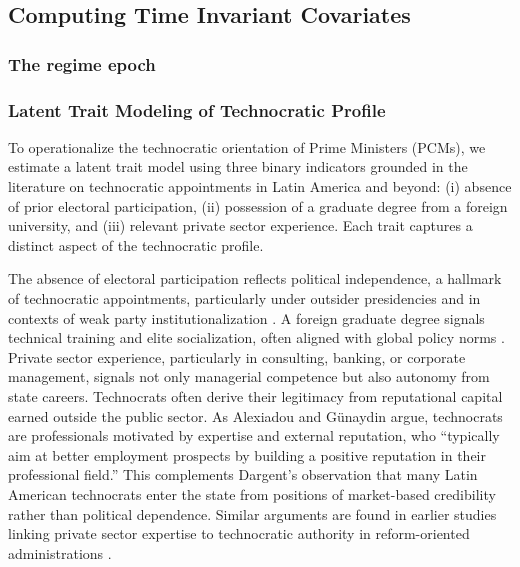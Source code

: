 \documentclass[a4paper, 12pt]{article}
\begin{document}

\subsection{Computing Time Invariant Covariates}

\subsubsection{The regime epoch}

\subsubsection{Latent Trait Modeling of Technocratic Profile}

To operationalize the technocratic orientation of Prime Ministers (PCMs), we estimate a latent trait model using three binary indicators grounded in the literature on technocratic appointments in Latin America and beyond: (i) absence of prior electoral participation, (ii) possession of a graduate degree from a foreign university, and (iii) relevant private sector experience. Each trait captures a distinct aspect of the technocratic profile.

The absence of electoral participation reflects political independence, a hallmark of technocratic appointments, particularly under outsider presidencies and in contexts of weak party institutionalization \citep{escobar-lemmon_coming_2010, carreras_presidentes_2013}. A foreign graduate degree signals technical training and elite socialization, often aligned with global policy norms \citep{alexiadou_ideologues_2016, camp_mexicos_2002}. Private sector experience, particularly in consulting, banking, or corporate management, signals not only managerial competence but also autonomy from state careers. Technocrats often derive their legitimacy from reputational capital earned outside the public sector. As Alexiadou and Günaydin \citep{alexiadou_commitment_2019} argue, technocrats are professionals motivated by expertise and external reputation, who “typically aim at better employment prospects by building a positive reputation in their professional field.” This complements Dargent’s \citep{dargent_technocracy_2014} observation that many Latin American technocrats enter the state from positions of market-based credibility rather than political dependence. Similar arguments are found in earlier studies linking private sector expertise to technocratic authority in reform-oriented administrations \citep{centeno_democracy_1997, weyland_politics_2021}.
\end{document}
